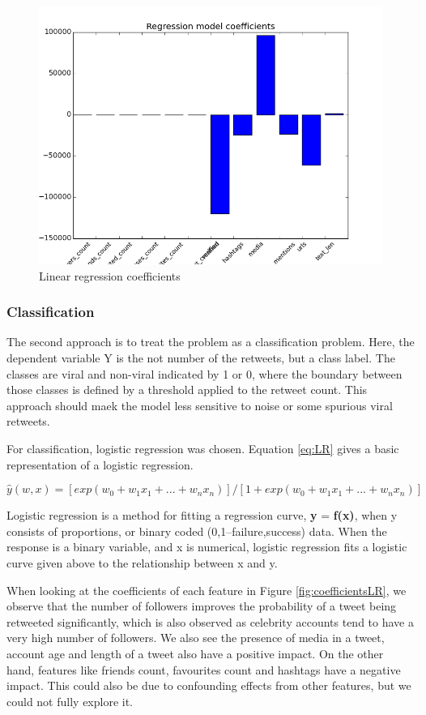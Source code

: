 \begin{figure}[H]
\centering
\includegraphics[width=0.6\linewidth]{img/coefficients.png}
\caption{Linear regression coefficients}
\label{fig:coefficients}
\end{figure}


\subsubsection{Classification}
The second approach is to treat the problem as a classification problem. Here, the dependent variable Y is the not number of the retweets, but a class label. The classes are viral and non-viral indicated by 1 or 0, where the boundary between those classes is defined by a threshold applied to the retweet count. This approach should maek the model less sensitive to noise or some spurious viral retweets.

For classification, logistic regression was chosen. Equation \ref{eq:LR} gives a basic representation of a logistic regression. 

\begin{equation}
\hat{y}(w,x) = [exp (w_0 + w_1 x_1 + ... + w_n x_n)] / [1 + exp (w_0 + w_1 x_1 + ... + w_n x_n)]
\label{eq:LR}
\end{equation}

Logistic regression is a method for fitting a regression curve, \textbf{y} = \textbf{f(x)}, when y consists of proportions, or binary coded (0,1--failure,success) data. When the response is a binary variable, and x is numerical, logistic regression fits a logistic curve given above to the relationship between x and y.

When looking at the coefficients of each feature in Figure \ref{fig:coefficientsLR}, we observe that the number of followers improves the probability of a tweet being retweeted significantly, which is also observed as celebrity accounts tend to have a very high number of followers. We also see the presence of media in a tweet, account age and length of a tweet also have a positive impact. On the other hand, features like friends count, favourites count and hashtags have a negative impact. This could also be due to confounding effects from other features, but we could not fully explore it.



